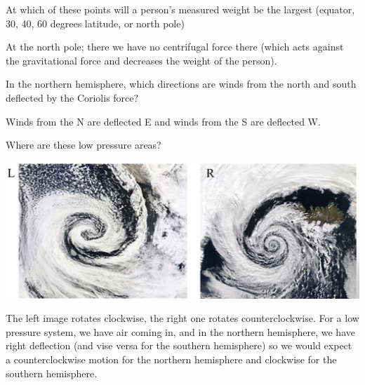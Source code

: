\documentclass[../PHYS306Notes.tex]{subfiles}
\begin{document}
At which of these points will a person's measured weight be the largest (equator, 30, 40, 60 degrees latitude, or north pole)
\begin{s}
At the north pole; there we have no centrifugal force there (which acts against the gravitational force and decreases the weight of the person). 
\end{s}

In the northern hemisphere, which directions are winds from the north and south deflected by the Coriolis force?
\begin{s}
Winds from the N are deflected E and winds from the S are deflected W.
\end{s}

Where are these low pressure areas?
\begin{center}
    \includegraphics[scale=0.5]{Lecture-16/l16-img2.png}
\end{center}
\begin{s}
The left image rotates clockwise, the right one rotates counterclockwise. For a low pressure system, we have air coming in, and in the northern hemisphere, we have right deflection (and vise versa for the southern hemisphere) so we would expect a counterclockwise motion for the northern hemisphere and clockwise for the southern hemisphere.
\end{s}
\end{document}

